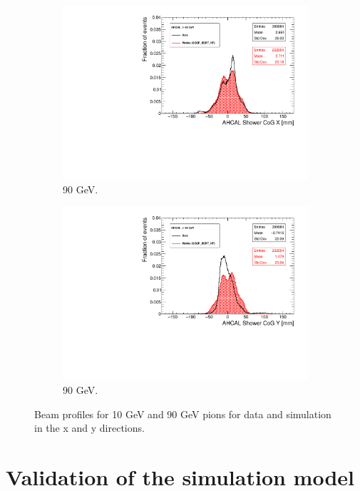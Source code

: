 \begin{figure}[htbp!]
\begin{subfigure}[t]{0.49\textwidth}
    \includegraphics[width=1.\linewidth]{../Thesis_Plots/Timing/Pions/Plots/Run24332_CoGX_AHCAL_90GeV_Comparison.pdf}
    \caption{90 GeV.} \label{fig:pi90GeVX}
  \end{subfigure}
  \hfill
  \begin{subfigure}[t]{0.49\textwidth}
    \includegraphics[width=1.\linewidth]{../Thesis_Plots/Timing/Pions/Plots/Run24332_CoGY_AHCAL_90GeV_Comparison.pdf}
    \caption{90 GeV.} \label{fig:pi90GeVY}
  \end{subfigure}
  \caption{Beam profiles for 10 GeV and 90 GeV pions for data and simulation in the x and y directions.}
  \label{fig:BPpi}
\end{figure}

\section{Validation of the simulation model}

